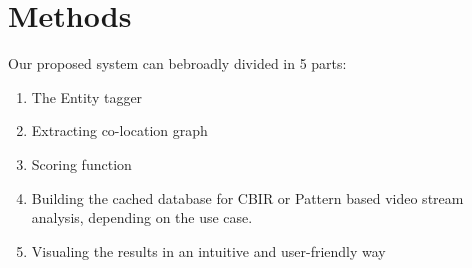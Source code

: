 \documentclass[conference]{IEEEtran}
\begin{document}
\section{Methods}
Our proposed system can bebroadly divided in 5 parts: 
    \begin{enumerate}
            \item The Entity tagger
            \item Extracting co-location graph
            \item Scoring function
            \item Building the cached database for CBIR or Pattern based video stream analysis, depending on the use case. 
            \item Visualing the results in an intuitive and user-friendly way
    \end{enumerate}
    
\end{document}
